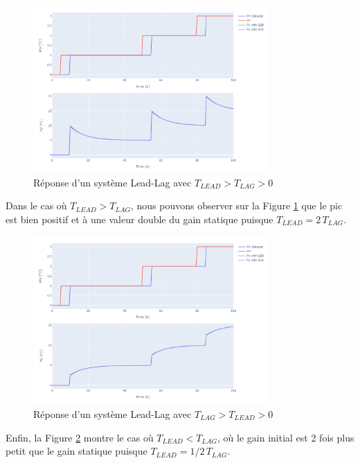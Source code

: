 \begin{figure}[H]
    \centering
    \includegraphics[width=0.8\textwidth]{../Plots/Lead-Lag/LL_Lead_higher_than_Lag.png}
    \caption{Réponse d'un système Lead-Lag avec $T_{LEAD} > T_{LAG} > 0$}
    \label{fig:Tlead_pos_Tlag_smaller}
\end{figure}
Dans le cas où $T_{LEAD} > T_{LAG}$, nous pouvons observer sur la Figure \ref{fig:Tlead_pos_Tlag_smaller} que le pic est bien positif et à une valeur double du gain statique puisque $T_{LEAD} = 2 \, T_{LAG}$.
\begin{figure}[H]
    \centering
    \includegraphics[width=0.8\textwidth]{../Plots/Lead-Lag/LL_Lead_lower_than_Lag.png}
    \caption{Réponse d'un système Lead-Lag avec $T_{LAG} > T_{LEAD} > 0$}
    \label{fig:Tlead_pos_Tlag_higher}
\end{figure}
Enfin, la Figure \ref{fig:Tlead_pos_Tlag_higher} montre le cas où $T_{LEAD} < T_{LAG}$, où le gain initial est 2 fois plus petit que le gain statique puisque $T_{LEAD} = 1/2 \, T_{LAG}$.